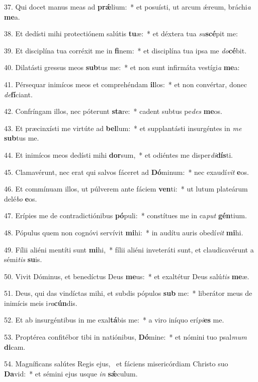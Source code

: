 37. Qui docet manus meas ad \textbf{prǽ}lium:~*  et posuísti, ut arcum ǽreum, bráchi\textit{a} \textbf{me}a.\

38. Et dedísti mihi protectiónem salútis \textbf{tu}æ:~*  et déxtera tua \textit{su}\textbf{scé}pit me:\

39. Et disciplína tua corréxit me in \textbf{fi}nem:~*  et disciplína tua ipsa me \textit{do}\textbf{cé}bit.\

40. Dilatásti gressus meos \textbf{sub}tus me:~*  et non sunt infirmáta vestígi\textit{a} \textbf{me}a:\

41. Pérsequar inimícos meos et comprehéndam \textbf{il}los:~*  et non convértar, donec \textit{de}\textbf{fí}ciant.\

42. Confríngam illos, nec póterunt \textbf{sta}re:~*  cadent subtus pe\textit{des} \textbf{me}os.\

43. Et præcinxísti me virtúte ad \textbf{bel}lum:~*  et supplantásti insurgéntes in \textit{me} \textbf{sub}tus me.\

44. Et inimícos meos dedísti mihi \textbf{dor}sum,~*  et odiéntes me disper\textit{di}\textbf{dís}ti.\

45. Clamavérunt, nec erat qui salvos fáceret ad \textbf{Dó}minum:~*  nec exaudí\textit{vit} \textbf{e}os.\

46. Et commínuam illos, ut púlverem ante fáciem \textbf{ven}ti:~*  ut lutum plateárum delé\textit{bo} \textbf{e}os.\

47. Erípies me de contradictiónibus \textbf{pó}puli:~*  constítues me in ca\textit{put} \textbf{gén}tium.\

48. Pópulus quem non cognóvi servívit \textbf{mi}hi:~*  in audítu auris obedí\textit{vit} \textbf{mi}hi.\

49. Fílii aliéni mentíti sunt \textbf{mi}hi,~*  fílii aliéni inveteráti sunt, et claudicavérunt a sémi\textit{tis} \textbf{su}is.\

50. Vivit Dóminus, et benedíctus Deus \textbf{me}us:~*  et exaltétur Deus salú\textit{tis} \textbf{me}æ.\

51. Deus, qui das vindíctas mihi, et subdis pópulos \textbf{sub} me:~*  liberátor meus de inimícis meis i\textit{ra}\textbf{cún}dis.\

52. Et ab insurgéntibus in me exal\textbf{tá}bis me:~*  a viro iníquo erí\textit{pi}\textbf{es} me.\

53. Proptérea confitébor tibi in natiónibus, \textbf{Dó}mine:~*  et nómini tuo psal\textit{mum} \textbf{di}cam.\

54. Magníficans salútes Regis ejus, \dag\  et fáciens misericórdiam Christo suo \textbf{Da}vid:~*  et sémini ejus usque \textit{in} \textbf{sǽ}culum.\

